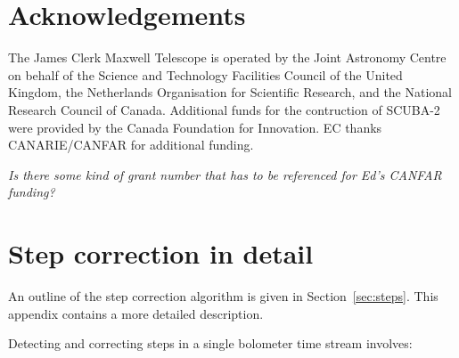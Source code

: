 \documentclass[useAMS,usenatbib,nofootinbib]{mn2e}
\newcommand{\scuba}{SCUBA-2}
\begin{document}



\section{Acknowledgements}

The James Clerk Maxwell Telescope is operated by the Joint Astronomy
Centre on behalf of the Science and Technology Facilities Council of
the United Kingdom, the Netherlands Organisation for Scientific
Research, and the National Research Council of Canada. Additional
funds for the contruction of SCUBA-2 were provided by the Canada
Foundation for Innovation. EC thanks CANARIE/CANFAR for additional
funding.

\textit{Is there some kind of grant number that has to be referenced
  for Ed's CANFAR funding?}




\appendix
\section[]{Step correction in detail}
\label{appendix:steps}

An outline of the step correction algorithm is given in
Section~\ref{sec:steps}. This appendix contains a more detailed
description.

Detecting and correcting steps in a single bolometer time stream involves:
\end{document}
